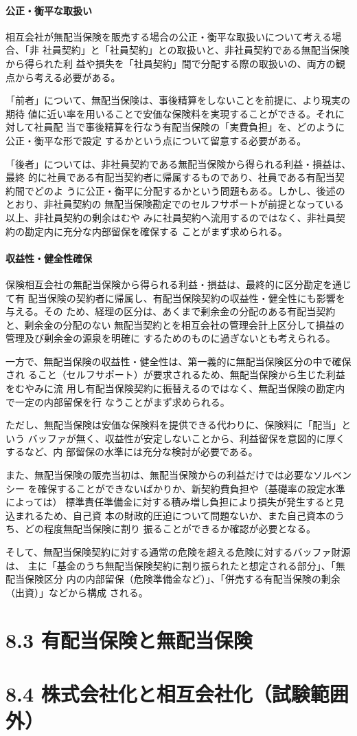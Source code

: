 \documentclass[report,gutter=10mm,fore-edge=10mm,uplatex,dvipdfmx]{jlreq}
\begin{document}
\paragraph{公正・衡平な取扱い}

相互会社が無配当保険を販売する場合の公正・衡平な取扱いについて考える場合、「非
社員契約」と「社員契約」との取扱いと、非社員契約である無配当保険から得られた利
益や損失を「社員契約」間で分配する際の取扱いの、両方の観点から考える必要がある。

「前者」について、無配当保険は、事後精算をしないことを前提に、より現実の期待
値に近い率を用いることで安価な保険料を実現することができる。それに対して社員配
当で事後精算を行なう有配当保険の「実費負担」を、どのように公正・衡平な形で設定
するかという点について留意する必要がある。

「後者」については、非社員契約である無配当保険から得られる利益・損益は、最終
的に社員である有配当契約者に帰属するものであり、社員である有配当契約間でどのよ
うに公正・衡平に分配するかという問題もある。しかし、後述のとおり、非社員契約の
無配当保険勘定でのセルフサポートが前提となっている以上、非社員契約の剰余はむや
みに社員契約へ流用するのではなく、非社員契約の勘定内に充分な内部留保を確保する
ことがまず求められる。

\paragraph{収益性・健全性確保}

保険相互会社の無配当保険から得られる利益・損益は、最終的に区分勘定を通じて有
配当保険の契約者に帰属し、有配当保険契約の収益性・健全性にも影響を与える。その
ため、経理の区分は、あくまで剰余金の分配のある有配当契約と、剰余金の分配のない
無配当契約とを相互会社の管理会計上区分して損益の管理及び剰余金の源泉を明確に
するためのものに過ぎないとも考えられる。

一方で、無配当保険の収益性・健全性は、第一義的に無配当保険区分の中で確保され
ること（セルフサポート）が要求されるため、無配当保険から生じた利益をむやみに流
用し有配当保険契約に振替えるのではなく、無配当保険の勘定内で一定の内部留保を行
なうことがまず求められる。

ただし、無配当保険は安価な保険料を提供できる代わりに、保険料に「配当」という
バッファが無く、収益性が安定しないことから、利益留保を意図的に厚くするなど、内
部留保の水準には充分な検討が必要である。

また、無配当保険の販売当初は、無配当保険からの利益だけでは必要なソルベンシー
を確保することができないばかりか、新契約費負担や（基礎率の設定水準によっては）
標準責任準備金に対する積み増し負担により損失が発生すると見込まれるため、自己資
本の財政的圧迫について問題ないか、また自己資本のうち、どの程度無配当保険に割り
振ることができるか確認が必要となる。

そして、無配当保険契約に対する通常の危険を超える危険に対するバッファ財源は、
主に「基金のうち無配当保険契約に割り振られたと想定される部分」、「無配当保険区分
内の内部留保（危険準備金など）」、「併売する有配当保険の剰余（出資）」などから構成
される。

\section{8.3 有配当保険と無配当保険}
\section{8.4 株式会社化と相互会社化（試験範囲外）}
\end{document}
